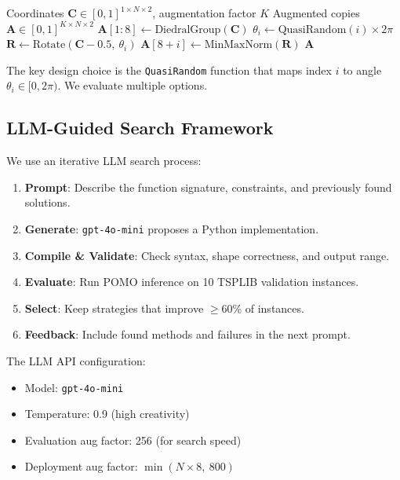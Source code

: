 \documentclass[11pt,a4paper]{article}
\begin{document}
\begin{algorithm}[h]
\caption{Quasi-Random Rotation Augmentation}
\label{alg:aug}
\begin{algorithmic}[1]
\Require Coordinates $\mathbf{C} \in [0,1]^{1 \times N \times 2}$,
         augmentation factor $K$
\Ensure Augmented copies $\mathbf{A} \in [0,1]^{K \times N \times 2}$
\State $\mathbf{A}[1{:}8] \gets \text{DiedralGroup}(\mathbf{C})$
  \State $\theta_i \gets \text{QuasiRandom}(i) \times 2\pi$
  \State $\mathbf{R} \gets \text{Rotate}(\mathbf{C} - 0.5,\ \theta_i)$
  \State $\mathbf{A}[8+i] \gets \text{MinMaxNorm}(\mathbf{R})$
\EndFor
\State \Return $\mathbf{A}$
\end{algorithmic}
\end{algorithm}

The key design choice is the \texttt{QuasiRandom} function that maps index $i$
to angle $\theta_i \in [0, 2\pi)$. We evaluate multiple options.

\subsection{LLM-Guided Search Framework}

We use an iterative LLM search process:

\begin{enumerate}
  \item \textbf{Prompt}: Describe the function signature, constraints, and
        previously found solutions.
  \item \textbf{Generate}: \texttt{gpt-4o-mini} proposes a Python
        implementation.
  \item \textbf{Compile \& Validate}: Check syntax, shape correctness, and
        output range.
  \item \textbf{Evaluate}: Run POMO inference on 10 TSPLIB validation instances.
  \item \textbf{Select}: Keep strategies that improve $\geq$60\% of instances.
  \item \textbf{Feedback}: Include found methods and failures in the next prompt.
\end{enumerate}

The LLM API configuration:
\begin{itemize}
  \item Model: \texttt{gpt-4o-mini}
  \item Temperature: 0.9 (high creativity)
  \item Evaluation aug factor: 256 (for search speed)
  \item Deployment aug factor: $\min(N \times 8,\ 800)$
\end{itemize}
\end{document}
